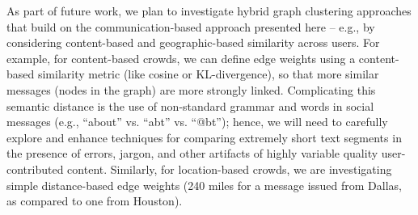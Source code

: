 \documentclass{sig-alternate}
\begin{document}
As part of future work, we plan to investigate hybrid graph clustering approaches
that build on the communication-based approach presented here -- e.g., by
considering content-based and geographic-based similarity across users. For
example, for content-based crowds, we can define edge weights using a
content-based similarity metric (like cosine or KL-divergence), so that more
similar messages (nodes in the graph) are more strongly linked. Complicating this
semantic distance is the use of non-standard grammar and words in social messages
(e.g., ``about'' vs. ``abt'' vs. ``@bt''); hence, we will need to carefully
explore and enhance techniques for comparing extremely short text segments in the
presence of errors, jargon, and other artifacts of highly variable quality
user-contributed content. Similarly, for location-based crowds, we are
investigating simple distance-based edge weights (240 miles for a message issued
from Dallas, as compared to one from Houston).





{\scriptsize

}
\balancecolumns %
\end{document}
